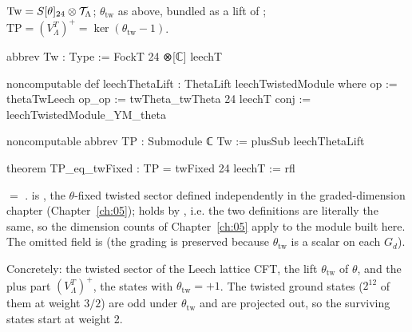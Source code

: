 \begin{definition}
$\mathrm{Tw}=S[\theta]_{24}\otimes\mathcal{T}_\Lambda$; $\theta_{\mathrm{tw}}$ as above, bundled as a lift
of ; $\mathrm{TP}=(V_\Lambda^T)^+=\ker(\theta_{\mathrm{tw}}-1)$.
\end{definition}
\begin{leancode}
abbrev Tw : Type := FockT 24 ⊗[ℂ] leechT

noncomputable def leechThetaLift : ThetaLift leechTwistedModule where
  op := thetaTwLeech
  op_op := twTheta_twTheta 24 leechT
  conj := leechTwistedModule_YM_theta

noncomputable abbrev TP : Submodule ℂ Tw := plusSub leechThetaLift

theorem TP_eq_twFixed : TP = twFixed 24 leechT := rfl
\end{leancode}
\begin{dictionary}
 $=$ .   is
, the $\theta$-fixed twisted sector defined
independently in the graded-dimension chapter (Chapter~\ref{ch:05});  holds by
, i.e. the two definitions are literally the same, so the dimension counts of
Chapter~\ref{ch:05} apply to the module built here.  The omitted field  is
 (the grading is preserved because $\theta_{\mathrm{tw}}$ is a scalar on
each $G_d$).
\end{dictionary}

\begin{physics}
Concretely: the twisted sector of the Leech lattice CFT, the lift $\theta_{\mathrm{tw}}$ of $\theta$, and the plus part $(V_\Lambda^T)^+$, the states with $\theta_{\mathrm{tw}}=+1$. The twisted ground states ($2^{12}$ of them at weight $3/2$) are odd under $\theta_{\mathrm{tw}}$ and are projected out, so the surviving states start at weight 2.
\end{physics}


